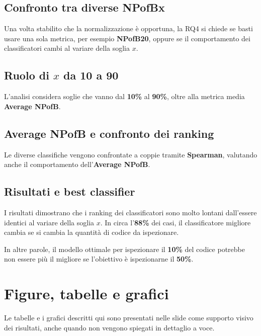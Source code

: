 \subsection{Confronto tra diverse NPofBx}

Una volta stabilito che la normalizzazione è opportuna, la RQ4 si chiede se basti usare una sola metrica, per esempio \textbf{NPofB20}, oppure se il comportamento dei classificatori cambi al variare della soglia \(x\).

\subsection{Ruolo di \(x\) da 10 a 90}

L'analisi considera soglie che vanno dal \textbf{10\%} al \textbf{90\%}, oltre alla metrica media \textbf{Average NPofB}.

\subsection{Average NPofB e confronto dei ranking}

Le diverse classifiche vengono confrontate a coppie tramite \textbf{Spearman}, valutando anche il comportamento dell'\textbf{Average NPofB}.

\subsection{Risultati e best classifier}

I risultati dimostrano che i ranking dei classificatori sono molto lontani dall'essere identici al variare della soglia \(x\). In circa l'\textbf{88\%} dei casi, il classificatore migliore cambia se si cambia la quantità di codice da ispezionare.

In altre parole, il modello ottimale per ispezionare il \textbf{10\%} del codice potrebbe non essere più il migliore se l'obiettivo è ispezionarne il \textbf{50\%}.

\section{Figure, tabelle e grafici}

\begin{notaslide}
Le tabelle e i grafici descritti qui sono presentati nelle slide come supporto visivo dei risultati, anche quando non vengono spiegati in dettaglio a voce.
\end{notaslide}


